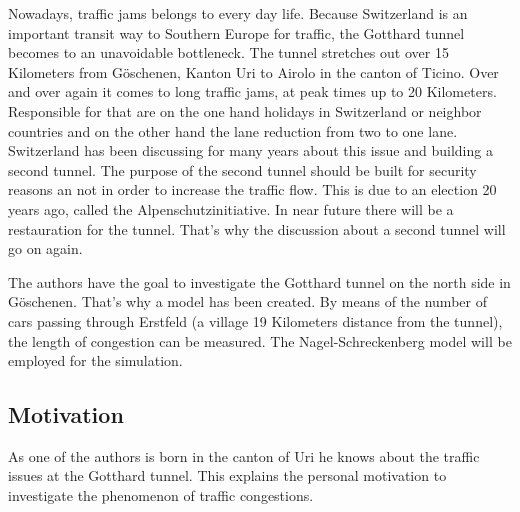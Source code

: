 Nowadays, traffic jams belongs to every day life. Because Switzerland is an important transit way to Southern Europe for traffic, the Gotthard tunnel becomes to an unavoidable bottleneck. The tunnel stretches out over 15 Kilometers from Göschenen, Kanton Uri to Airolo in the canton of Ticino. Over and over again it comes to long traffic jams, at peak times up to 20 Kilometers. Responsible for that are  on the one hand holidays in Switzerland or neighbor countries and on the other hand the lane reduction from two to one lane. Switzerland has been discussing for many years about this issue and building a second tunnel. The purpose of the second tunnel should be built for security reasons an not in order to increase the traffic flow. This is due to an election 20 years ago, called the Alpenschutzinitiative. 
In near future there will be a restauration for the tunnel. That's why the discussion about a second tunnel will go on again.

The authors have the goal to investigate the Gotthard tunnel on the north side in Göschenen. That's why a model has been created. By means of the number of cars passing through Erstfeld (a village 19 Kilometers distance from the tunnel), the length of congestion can be measured. The Nagel-Schreckenberg model will be employed for the simulation.


\subsection{Motivation}
As one of the authors is born in the canton of Uri he knows about the traffic issues at the Gotthard tunnel. This explains the personal motivation to investigate the phenomenon of traffic congestions.














